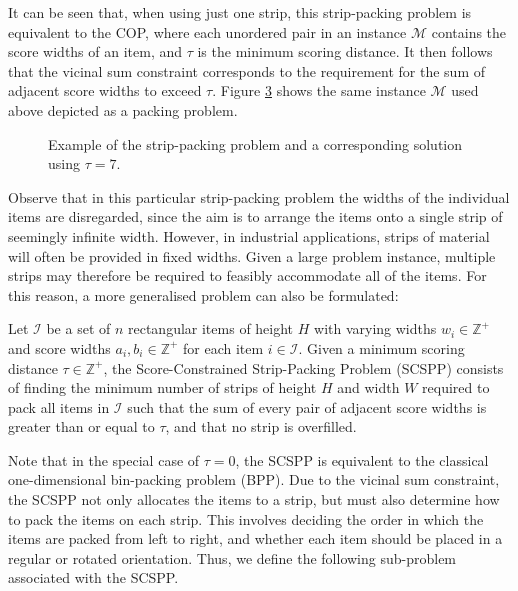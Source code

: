 \documentclass[runningheads]{llncs}
\begin{document}
It can be seen that, when using just one strip, this strip-packing problem is equivalent to the COP, where each unordered pair in an instance $\mathcal{M}$ contains the score widths of an item, and $\tau$ is the minimum scoring distance. It then follows that the vicinal sum constraint corresponds to the requirement for the sum of adjacent score widths to exceed $\tau$. Figure \ref{fig:items/aligned} shows the same instance $\mathcal{M}$ used above depicted as a packing problem.

\begin{figure}	
	\centering
	\begin{subfigure}[h]{0.44\textwidth}
		
		\label{fig:items}
	\end{subfigure} 
	\begin{subfigure}[h]{0.7\textwidth}
		
		\label{fig:itemsaligned}
	\end{subfigure}
	\caption{Example of the strip-packing problem and a corresponding solution using $\tau = 7$.}
	\label{fig:items/aligned}
\end{figure}

Observe that in this particular strip-packing problem the widths of the individual items are disregarded, since the aim is to arrange the items onto a single strip of seemingly infinite width. However, in industrial applications, strips of material will often be provided in fixed widths. Given a large problem instance, multiple strips may therefore be required to feasibly accommodate all of the items. For this reason, a more generalised problem can also be formulated:

\begin{definition}
	Let $\mathcal{I}$ be a set of $n$ rectangular items of height $H$ with varying widths $w_i \in \mathbb{Z}^+$ and score widths $a_i, b_i \in \mathbb{Z}^+$ for each item $i \in \mathcal{I}$. Given a minimum scoring distance $\tau \in \mathbb{Z}^+$, the Score-Constrained Strip-Packing Problem (SCSPP) consists of finding the minimum number of strips of height $H$ and width $W$ required to pack all items in $\mathcal{I}$ such that the sum of every pair of adjacent score widths is greater than or equal to $\tau$, and that no strip is overfilled.
\end{definition}

Note that in the special case of $\tau = 0$, the SCSPP is equivalent to the classical one-dimensional bin-packing problem (BPP). Due to the vicinal sum constraint, the SCSPP not only allocates the items to a strip, but must also determine how to pack the items on each strip. This involves deciding the order in which the items are packed from left to right, and whether each item should be placed in a regular or rotated orientation. Thus, we define the following sub-problem associated with the SCSPP.
\end{document}
